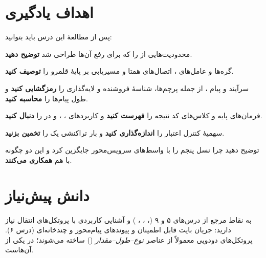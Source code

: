 \documentclass[11pt,a4paper]{article}
\begin{document}
\ACNcover

\section{اهداف یادگیری}
پس از مطالعهٔ این درس باید بتوانید:
\begin{objectives}
  \item محدودیت‌هایی از  را که  برای رفع آن‌ها طراحی شد \textbf{توضیح دهید}.
  \item گره‌ها و عامل‌های ، اتصال‌های همتا و مسیریابی بر پایهٔ قلمرو را \textbf{توصیف کنید}.
  \item سرآیند و  پیام ، از جمله پرچم‌ها، شناسهٔ فروشنده و لایه‌گذاری را \textbf{رمزگشایی کنید} و
        طول پیام‌ها را \textbf{محاسبه کنید}.
  \item فرمان‌های پایه و کلاس‌های کد نتیجه را \textbf{فهرست کنید} و کاربردهای ، ،  و  در
         را \textbf{دنبال کنید}.
  \item سهمیهٔ کنترل اعتبار را \textbf{اندازه‌گذاری کنید} و بار تراکنشی یک  را \textbf{تخمین بزنید}.
  \item توضیح دهید چرا نسل پنجم  را با واسط‌های سرویس‌محور  جایگزین کرد و این دو چگونه با هم
        \textbf{همکاری می‌کنند}.
\end{objectives}

\section{دانش پیش‌نیاز}
به نقاط مرجع  از درس‌های ۵ و ۹ (، ، ، ) و آشنایی کاربردی با پروتکل‌های انتقال
نیاز دارید: جریان بایت قابل اطمینان  و پیوندهای پیام‌محور و چندخانه‌ای  (درس ۶). پروتکل‌های
دودویی معمولاً از عناصر \emph{نوع--طول--مقدار} () ساخته می‌شوند؛  در  یکی از آن‌هاست.
\end{document}
